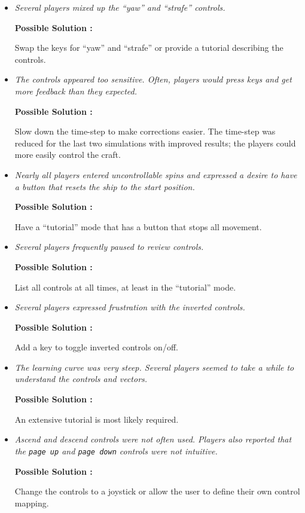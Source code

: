 \begin{itemize}

  \item \emph{Several players mixed up the ``yaw'' and ``strafe'' controls.}
        
        \textbf{Possible Solution : } \parbox[t]{5in}{Swap the keys for ``yaw'' and ``strafe'' or provide a tutorial describing the controls.}
				
  \item \emph{The controls appeared too sensitive. Often, players would press keys and get more feedback than they expected.}
        
        \textbf{Possible Solution : } \parbox[t]{5in}{Slow down the time-step to make corrections easier.  The time-step was reduced for the last two simulations with improved results; the players could more easily control the craft.}
				
  \item \emph{Nearly all players entered uncontrollable spins and expressed a desire to have a button that resets the ship to the start position.}
        
        \textbf{Possible Solution : } \parbox[t]{5in}{Have a ``tutorial'' mode that has a button that stops all movement.}

  \item \emph{Several players frequently paused to review controls.}
        
        \textbf{Possible Solution : } \parbox[t]{5in}{List all controls at all times, at least in the ``tutorial'' mode.}
				
	\item \emph{Several players expressed frustration with the inverted controls.}
        
        \textbf{Possible Solution : } \parbox[t]{5in}{Add a key to toggle inverted controls on/off.}	

	\item \emph{The learning curve was very steep. Several players seemed to take a while to understand the controls and vectors.}
        
        \textbf{Possible Solution : } \parbox[t]{5in}{An extensive tutorial is most likely required.}	

	\item \emph{Ascend and descend controls were not often used.  Players also reported that the \texttt{page up} and \texttt{page down} controls were not intuitive.}
        
        \textbf{Possible Solution : } \parbox[t]{5in}{Change the controls to a joystick or allow the user to define their own control mapping.}


\end{itemize}
